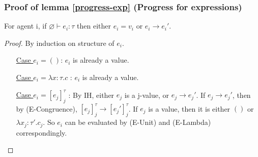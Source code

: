 \subsubsection{Proof of lemma \ref{progress-exp} (Progress for expressions)}
For agent i, if $\varnothing \vdash e_i : \tau$ then either $e_i = v_i$ or $e_i \longrightarrow e_i'$.
\begin{proof}
By induction on structure of $e_i$.
\begin{enumerate}[align=left]
\item[ \underline{Case $e_i = ()$}:] $e_i$ is already a value.
\item[ \underline{Case $e_i = \lambda x : \tau. c$} :] $e_i$ is already a value.
\item[ \underline{Case $e_i = [e_j]^\tau_j$} :] By IH, either $e_j$ is a j-value, or $e_j \longrightarrow e_j'$. If $e_j \longrightarrow e_j'$, then by (E-Congruence), $[e_j]^\tau_j \longrightarrow [e_j']^\tau_j$. If $e_j$ is a value, then it is either $()$ or $\lambda x_j : \tau' . c_j$. So $e_i$ can be evaluated by (E-Unit) and (E-Lambda) correspondingly.
\end{enumerate}
\end{proof}

